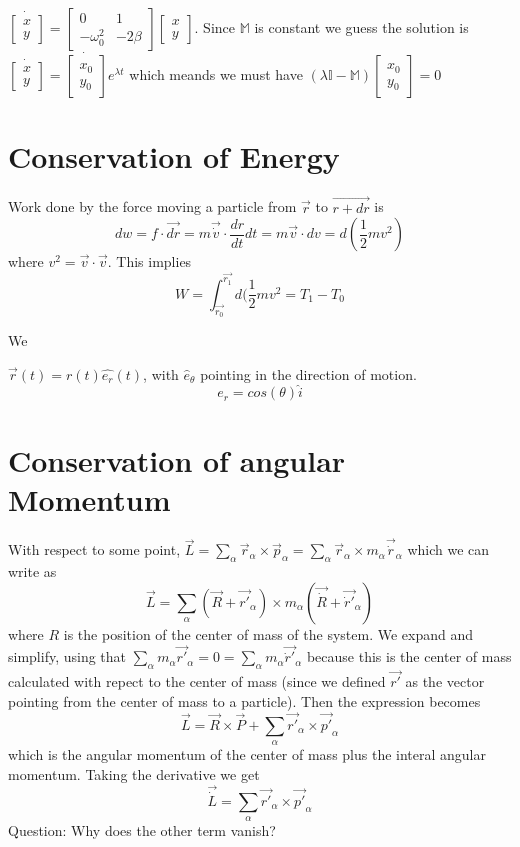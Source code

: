 \documentclass{homework}
\newcommand{\MM}{\mathbb{M}}
\newcommand{\m}[1]{\begin{bmatrix} #1 \end{bmatrix}}
\begin{document}
$\dot{\m{x \\ y}} = \m{0 & 1 \\ -\omega_0^2 & -2\beta} \m{x \\ y}$. Since $\MM$ is constant we guess the solution is $\dot{\m{x \\ y}} = \dot{\m{x_0 \\ y_0}}e^{\lambda t}$ which meands we must have $(\lambda \mathbb{I} - \mathbb{M})\m{x_0 \\ y_0} = 0$






\section{Conservation of Energy}

Work done by the force moving a particle from $\vec{r}$ to $\vec{r + dr}$ is 
\[dw = f\cdot \vec{dr} = m\vec{\dot{v}} \cdot \frac{dr}{dt}dt = m\vec{v} \cdot dv = d(\frac{1}{2}mv^2) \]
where $v^2 = \vec{v} \cdot \vec{v}$. This implies 
\[W = \int_{\vec{r_0}}^{\vec{r_1}}d(\frac{1}{2}mv^2 = T_1 - T_0 \]





We 





$\vec{r}(t) = r(t)\hat{e_r}(t)$, with $\hat e_{\theta}$ pointing in the direction of motion.
\[e_r = cos(\theta)\hat i\]




\section{Conservation of angular Momentum}
With respect to some point, $\vec{L} = \sum_{\alpha}\vec{r}_{\alpha} \times \vec{p}_{\alpha} = \sum_{\alpha}\vec{r}_{\alpha} \times  m_{\alpha}\vec{\dot{r}}_{\alpha}$ which we can write as 
\[\vec{L} = \sum_{\alpha} (\vec{R} + \vec{r'}_{\alpha}) \times m_{\alpha}(\vec{\dot{R}} + \vec{\dot{r}'}_{\alpha})\]
where $R$ is the position of the center of mass of the system. We expand and simplify, using that $\sum_{\alpha}m_{\alpha}\vec {r'}_{\alpha} = 0= \sum_{\alpha}m_{\alpha}\vec {\dot{r}'}_{\alpha}$ because this is the center of mass calculated with repect to the center of mass (since we defined $\vec{r'}$ as the vector pointing from the center of mass to a particle). Then the expression becomes
\[\vec{L} = \vec{R} \times \vec{P} + \sum_{\alpha}\vec{r'}_{\alpha} \times \vec{p'}_{\alpha}\]
which is the angular momentum of the center of mass plus the interal angular momentum. 
Taking the derivative we get
\[\vec{\dot{L}} = \sum_{\alpha}\vec{r'}_{\alpha} \times \vec{p'}_{\alpha}\]
Question: Why does the other term vanish?
\end{document}
